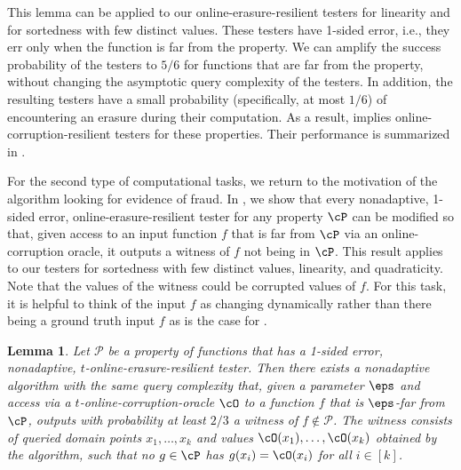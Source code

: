 \documentclass[11pt]{article}
\numberwithin{equation}{section}
\newtheorem{lemma}[theorem]{Lemma}
\theoremstyle{definition}
\theoremstyle{plain}
\begin{document}
This lemma can be applied to our online-erasure-resilient testers for linearity and for sortedness with few distinct values.  These testers have 1-sided error, i.e., they err only when the function is far from the property. We can amplify the success probability of the testers to $5/6$ for functions that are far from the property, without changing the asymptotic query complexity of the testers. In addition, the resulting testers have a small probability (specifically, at most $1/6$) of encountering an erasure during their computation. As a result,  implies online-corruption-resilient testers for these properties. Their performance is summarized in .

For the second type of computational tasks, we return to the motivation of the algorithm looking for evidence of fraud.  In , we  show that every nonadaptive, 1-sided error, online-erasure-resilient tester for any property $\cP$ can be modified so that, given access to an input function $f$ that is far from $\cP$ via an online-corruption oracle, it outputs a witness of $f$ not being in $\cP$. 
This result applies to our testers for sortedness with few distinct values, linearity, and quadraticity. Note that the values of the witness could be corrupted values of $f$. For this task, it is helpful to think of the input $f$ as changing dynamically rather than there being a ground truth input $f$ as is the case for .

\begin{lemma}\label{lem:detect}
    Let $\mathcal{P}$ be a property of functions that has a 1-sided error, nonadaptive, $t$-online-erasure-resilient tester.
    Then there exists a nonadaptive algorithm with the same query complexity that, given a parameter $\eps$ and access via a $t$-online-corruption-oracle $\cO$ to a function $f$ that is $\eps$-far from $\cP$, outputs with probability at least $2/3$ a witness of  $f \notin \mathcal{P}$. 
    The witness consists of queried domain points $x_1, \dots, x_k$ and values $\cO(x_1), \dots, \cO(x_k)$ obtained by the algorithm, such that no $g \in \cP$ has $g(x_i) = \cO(x_i)$ for all $i \in [k]$. 
\end{lemma}

%
\end{document}
